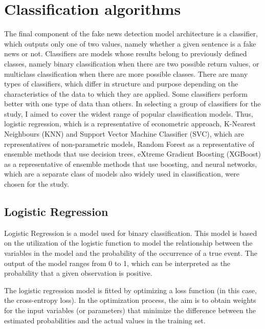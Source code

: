 \section{Classification algorithms}
The final component of the fake news detection model architecture is a classifier, which outputs only one of two values, namely whether a given sentence is a fake news or not. Classifiers are models whose results belong to previously defined classes, namely binary classification when there are two possible return values, or multiclass classification when there are more possible classes. There are many types of classifiers, which differ in structure and purpose depending on the characteristics of the data to which they are applied. Some classifiers perform better with one type of data than others. In selecting a group of classifiers for the study, I aimed to cover the widest range of popular classification models. Thus, logistic regression, which is a representative of econometric approach, K-Nearest Neighbours (KNN) and Support Vector Machine Classifier (SVC), which are representatives of non-parametric models, Random Forest as a representative of ensemble methods that use decision trees, eXtreme Gradient Boosting (XGBoost) as a representative of ensemble methods that use boosting, and neural networks, which are a separate class of models also widely used in classification, were chosen for the study.

\subsection{Logistic Regression}
Logistic Regression is a model used for binary classification. This model is based on the utilization of the logistic function to model the relationship between the variables in the model and the probability of the occurrence of a true event. The output of the model ranges from 0 to 1, which can be interpreted as the probability that a given observation is positive.

The logistic regression model is fitted by optimizing a loss function (in this case, the cross-entropy loss). In the optimization process, the aim is to obtain weights for the input variables (or parameters) that minimize the difference between the estimated probabilities and the actual values in the training set.

